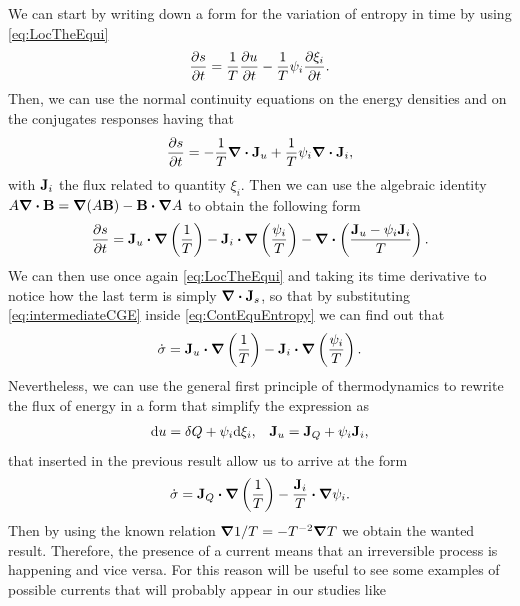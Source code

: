 {
    We can start by writing down a form for the variation of entropy in time by using \eqref{eq:LocTheEqui}
    \begin{equation}
        \pdv{s}{t} = \frac{1}{T}\pdv{u}{t} - \frac{1}{T}\psi_i\pdv{\xi_i}{t}.
    \end{equation}
    Then, we can use the normal continuity equations on the energy densities and on the conjugates responses having that
    \begin{equation}
        \pdv{s}{t} = -\frac{1}{T}\grad\vdot\vb{J}_u + \frac{1}{T}\psi_i\grad\vdot\vb{J}_i,
    \end{equation}
    with $\vb{J}_i$ the flux related to quantity $\xi_i$. Then we can use the algebraic identity $A\grad\vdot \vb{B} = \grad(A\vb{B}) - \vb{B}\vdot\grad A$ to obtain the following form
    \begin{equation}
        \label{eq:intermediateCGE}
        \pdv{s}{t} = \vb{J}_u\vdot\grad\left( \frac{1}{T} \right) - \vb{J}_i\vdot\grad\left( \frac{\psi_i}{T} \right) - \grad\vdot\left( \frac{\vb{J}_u - \psi_i\vb{J}_i}{T} \right).
    \end{equation}
    We can then use once again \eqref{eq:LocTheEqui} and taking its time derivative to notice how the last term is simply $\grad\vdot\vb{J}_s$, so that by substituting \eqref{eq:intermediateCGE} inside \eqref{eq:ContEquEntropy} we can find out that
    \begin{equation}
        \dot{\sigma} = \vb{J}_u\vdot\grad\left( \frac{1}{T} \right) - \vb{J}_i\vdot\grad\left( \frac{\psi_i}{T} \right).
    \end{equation}
    Nevertheless, we can use the general first principle of thermodynamics to rewrite the flux of energy in a form that simplify the expression as
    \begin{align}
        &\dd u = \delta Q + \psi_i \dd \xi_i, &\vb{J}_u = \vb{J}_Q + \psi_i\vb{J}_i,
    \end{align}
    that inserted in the previous result allow us to arrive at the form
    \begin{equation}
        \dot{\sigma} = \vb{J}_Q\vdot\grad\left( \frac{1}{T} \right) - \frac{\vb{J}_i}{T}\vdot\grad\psi_i.
    \end{equation}
    Then by using the known relation $\grad 1/T = -T^{-2}\grad T$ we obtain the wanted result.
}
\noindent
Therefore, the presence of a current means that an irreversible process is happening and vice versa. For this reason will be useful to see some examples of possible currents that will probably appear in our studies like
